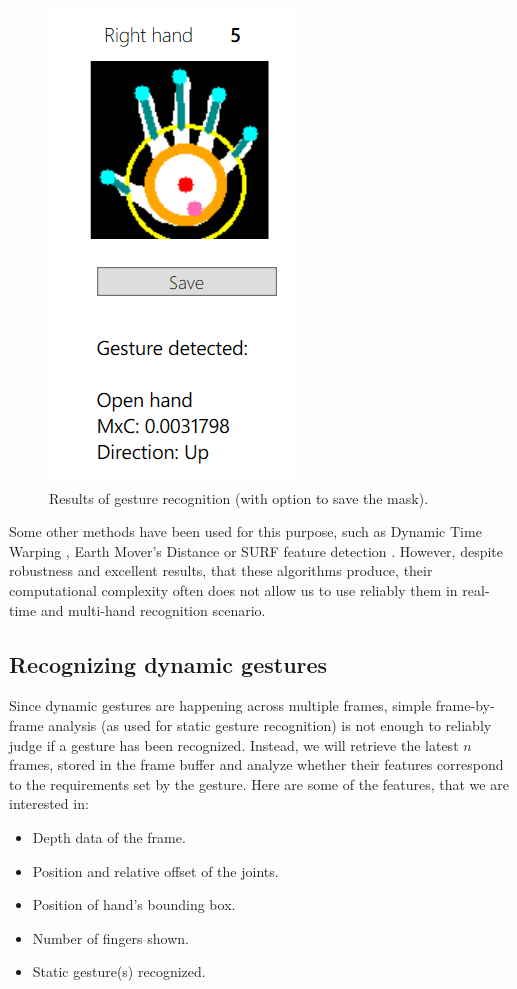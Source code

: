 \documentclass[a4paper,11pt,oneside]{article}
\begin{document}
\begin{figure}[H]
\centering
\includegraphics[scale=1]{hand-control.png}
\caption{Results of gesture recognition (with option to save the mask).}
\end{figure}

Some other methods have been used for this purpose, such as Dynamic Time Warping \cite{DR01}, Earth Mover's Distance \cite{ZH01} or SURF feature detection \cite{HB01}.  However, despite robustness and excellent results, that these algorithms produce, their computational complexity often does not allow us to use reliably them in real-time and multi-hand recognition scenario.

\subsection{Recognizing dynamic gestures}

Since dynamic gestures are happening across multiple frames, simple frame-by-frame analysis (as used for static gesture recognition) is not enough to reliably judge if a gesture has been recognized. Instead, we will retrieve the latest $n$ frames, stored in the frame buffer and analyze whether their features correspond to the requirements set by the gesture. Here are some of the features, that we are interested in:

\begin{itemize}
\item Depth data of the frame.
\item Position and relative offset of the joints.
\item Position of hand's bounding box.
\item Number of fingers shown.
\item Static gesture(s) recognized.
\end{itemize}
\end{document}
